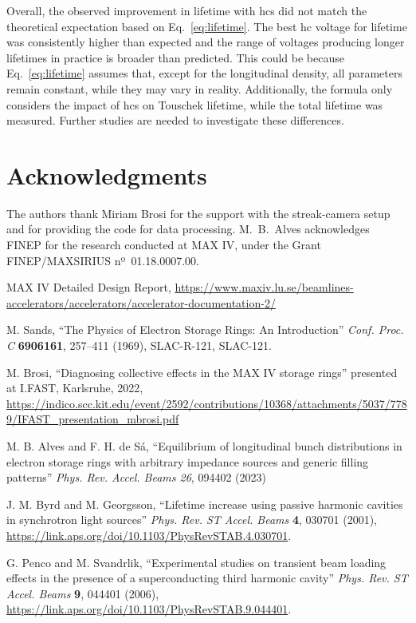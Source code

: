 \documentclass[a4paper,
               ]{jacow}
\begin{document}
Overall, the observed improvement in lifetime with \glspl{hc} did not match the theoretical expectation based on Eq.~\eqref{eq:lifetime}. The best \gls{hc} voltage for lifetime was consistently higher than expected and the range of voltages producing longer lifetimes in practice is broader than predicted. This could be because Eq.~\eqref{eq:lifetime} assumes that, except for the longitudinal density, all parameters remain constant, while they may vary in reality. Additionally, the formula only considers the impact of \glspl{hc} on Touschek lifetime, while the total lifetime was measured. Further studies are needed to investigate these differences.

\section{Acknowledgments}
The authors thank Miriam Brosi for the support with the streak-camera setup and for providing the code for data processing. M.~B.~Alves acknowledges FINEP for the research conducted at MAX IV, under the Grant FINEP/MAXSIRIUS nº~01.18.0007.00.
%
	{\printbibliography}%
	{%

	\begin{thebibliography}{9} %

    MAX IV Detailed Design Report,
    \url{https://www.maxiv.lu.se/beamlines-accelerators/accelerators/accelerator-documentation-2/}

    M. Sands,
    ``The Physics of Electron Storage Rings: An Introduction''
    \emph{Conf. Proc. C} \textbf{6906161}, 257--411 (1969),
    SLAC-R-121, SLAC-121.

    M. Brosi,
    ``Diagnosing collective effects in the MAX IV storage rings''
    presented at I.FAST, Karlsruhe, 2022,
    \url{https://indico.scc.kit.edu/event/2592/contributions/10368/attachments/5037/7789/IFAST_presentation_mbrosi.pdf}

    M. B. Alves and F. H. de S\'a,
    ``Equilibrium of longitudinal bunch distributions in electron storage rings with arbitrary impedance sources and generic filling patterns''
    \emph{Phys. Rev. Accel. Beams 26}, 094402 (2023)

    J. M. Byrd and M. Georgsson,
    ``Lifetime increase using passive harmonic cavities in synchrotron light sources''
    \emph{Phys. Rev. ST Accel. Beams} \textbf{4}, 030701 (2001),
    \url{https://link.aps.org/doi/10.1103/PhysRevSTAB.4.030701}.

    G. Penco and M. Svandrlik,
    ``Experimental studies on transient beam loading effects in the presence of a superconducting third harmonic cavity''
    \emph{Phys. Rev. ST Accel. Beams} \textbf{9}, 044401 (2006),
    \url{https://link.aps.org/doi/10.1103/PhysRevSTAB.9.044401}.

	\end{thebibliography}
} %
\end{document}
